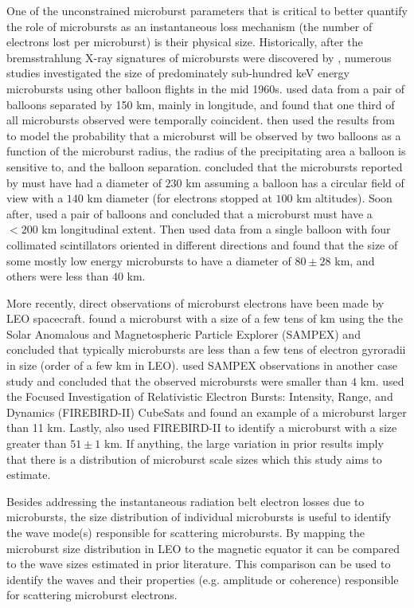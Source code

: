 \documentclass[draft]{agujournal2019}
\begin{document}
One of the unconstrained microburst parameters that is critical to better quantify the role of microbursts as an instantaneous loss mechanism (the number of electrons lost per microburst) is their physical size. Historically, after the bremsstrahlung X-ray signatures of microbursts were discovered by , numerous studies investigated the size of predominately sub-hundred keV energy microbursts using other balloon flights in the mid 1960s.  used data from a pair of balloons separated by 150 km, mainly in longitude, and found that one third of all microbursts observed were temporally coincident.  then used the results from  to model the probability that a microburst will be observed by two balloons as a function of the microburst radius, the radius of the precipitating area a balloon is sensitive to, and the balloon separation.  concluded that the microbursts reported by   must have had a diameter of $230$ km assuming a balloon has a circular field of view with a $140$ km diameter (for electrons stopped at $100$ km altitudes). Soon after,  used a pair of balloons and concluded that a microburst must have a $<200$ km longitudinal extent. Then  used data from a single balloon with four collimated scintillators oriented in different directions and found that the size of some mostly low energy microbursts to have a diameter of $80 \pm 28$ km, and others were less than $40$ km. 

More recently, direct observations of microburst electrons have been made by LEO spacecraft.  found a microburst with a size of a few tens of km using the the Solar Anomalous and Magnetospheric Particle Explorer (SAMPEX) and concluded that typically microbursts are less than a few tens of electron gyroradii in size (order of a few km in LEO).  used SAMPEX observations in another case study and concluded that the observed microbursts were smaller than $4$ km.  used the Focused Investigation of Relativistic Electron Bursts: Intensity, Range, and Dynamics (FIREBIRD-II) CubeSats and found an example of a microburst larger than 11 km. Lastly,  also used FIREBIRD-II to identify a microburst with a size greater than $ 51 \pm 1$ km. If anything, the large variation in prior results imply that there is a distribution of microburst scale sizes which this study aims to estimate.

Besides addressing the instantaneous radiation belt electron losses due to microbursts, the size distribution of individual microbursts is useful to identify the wave mode(s) responsible for scattering microbursts. By mapping the microburst size distribution in LEO to the magnetic equator it can be compared to the wave sizes estimated in prior literature. This comparison can be used to identify the waves and their properties (e.g. amplitude or coherence) responsible for scattering microburst electrons.
\end{document}
